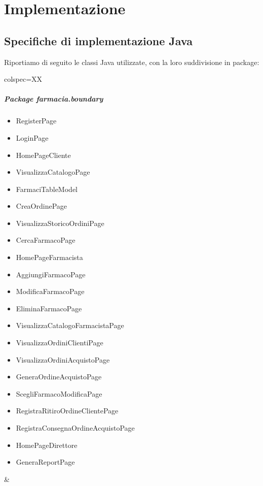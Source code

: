 \chapter{Implementazione}

\section{Specifiche di implementazione Java}

Riportiamo di seguito le classi Java utilizzate, con la loro suddivisione in package:

\begin{table}[!ht]
	\begin{tblr}{colspec=XX}
		\begin{minipage}[t]{0.45\textwidth}
			\paragraph{Package farmacia.boundary}
			\begin{itemize}[label=--]
				\item RegisterPage
				\item LoginPage
				\item HomePageCliente
				\item VisualizzaCatalogoPage
				\item FarmaciTableModel
				\item CreaOrdinePage
				\item VisualizzaStoricoOrdiniPage
				\item CercaFarmacoPage
				\item HomePageFarmacista
				\item AggiungiFarmacoPage
				\item ModificaFarmacoPage
				\item EliminaFarmacoPage
				\item VisualizzaCatalogoFarmacistaPage
				\item VisualizzaOrdiniClientiPage
				\item VisualizzaOrdiniAcquistoPage
				\item GeneraOrdineAcquistoPage
				\item ScegliFarmacoModificaPage
				\item RegistraRitiroOrdineClientePage
				\item RegistraConsegnaOrdineAcquistoPage
				\item HomePageDirettore
				\item GeneraReportPage
			\end{itemize}
		\end{minipage} &
		\begin{minipage}[t]{0.45\textwidth}

\end{minipage}
\end{tblr}
\end{table}
